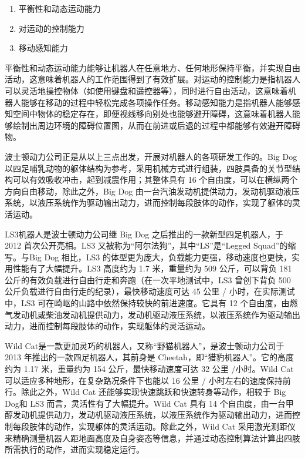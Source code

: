 \documentclass[10pt]{article}
\begin{document}
\begin{enumerate}
	\item 平衡性和动态运动能力
	\item 对运动的控制能力
	\item 移动感知能力
\end{enumerate}

平衡性和动态运动能力能够让机器人在任意地方、任何地形保持平衡，并实现自由活动，这意味着机器人的工作范围得到了有效扩展。对运动的控制能力是指机器人可以灵活地操控物体（如使用键盘和遥控器等），同时进行自由活动，这意味着机器人能够在移动的过程中轻松完成各项操作任务。移动感知能力是指机器人能够感知空间中物体的稳定存在，即便视线移向别处也能够避开障碍，这意味着机器人能够绘制出周边环境的障碍位置图，从而在前进或后退的过程中都能够有效避开障碍物。

波士顿动力公司正是从以上三点出发，开展对机器人的各项研发工作的。Big Dog 以四足哺乳动物的躯体结构为参考，采用机械方式进行组装，四肢具备的关节型结构可以有效吸收冲击，起到减震作用；其整体具有 16 个自由度，可以在横纵两个方向自由移动，除此之外，Big Dog 由一台汽油发动机提供动力，发动机驱动液压系统，以液压系统作为驱动输出动力，进而控制每段肢体的动作，实现了躯体的灵活运动。

LS3机器人是波士顿动力公司继 Big Dog 之后推出的一款新型四足机器人，于 2012 首次公开亮相。LS3 又被称为“阿尔法狗”，其中“LS”是“Legged Squad”的缩写。与Big Dog 相比，LS3 的体型更为庞大，负载能力更强，移动速度也更快，实用性能有了大幅提升。LS3 高度约为 1.7 米，重量约为 509 公斤，可以背负 181 公斤的有效负载进行自由行走和奔跑（在一次平地测试中，LS3 曾创下背负 500 公斤负载进行自由行走的纪录），最快移动速度可达 45 公里 / 小时，在实际测试中，LS3 可在崎岖的山路中依然保持较快的前进速度。它具有 12 个自由度，由燃气发动机或柴油发动机提供动力，发动机驱动液压系统，以液压系统作为驱动输出动力，进而控制每段肢体的动作，实现躯体的灵活运动。

Wild Cat是一款更加灵巧的机器人，又称“野猫机器人”，是波士顿动力公司于 2013 年推出的一款四足机器人，其前身是 Cheetah，即“猎豹机器人”。它的高度约为 1.17 米，重量约为 154 公斤，最快移动速度可达 32 公里 /小时。Wild Cat 可以适应多种地形，在复杂路况条件下也能以 16 公里 / 小时左右的速度保持前行。除此之外，Wild Cat 还能够实现快速跳跃和快速转身等动作，相较于 Big Dog和 LS3 而言，灵活性有了大幅提升。Wild Cat 具有 14 个自由度，由一台甲醇发动机提供动力，发动机驱动液压系统，以液压系统作为驱动输出动力，进而控制每段肢体的动作，实现躯体的灵活运动。除此之外，Wild Cat 采用激光测距仪来精确测量机器人距地面高度及自身姿态等信息，并通过动态控制算法计算出四肢所需执行的动作，进而实现稳定运行。
\end{document}
